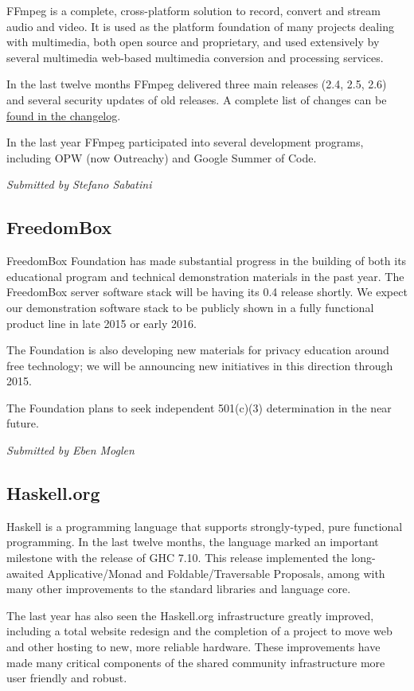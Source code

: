 \documentclass[letterpaper]{report}
\begin{document}
FFmpeg is a complete, cross-platform solution to record, convert and stream
audio and video. It is used as the platform foundation of many projects
dealing with multimedia, both open source and proprietary, and used
extensively by several multimedia web-based multimedia conversion and
processing services.

In the last twelve months FFmpeg delivered three main releases (2.4, 2.5,
2.6) and several security updates of old releases. A complete list of
changes can be
\href{http://git.videolan.org/?p=ffmpeg.git;a=blob_plain;f=Changelog;hb=HEAD}{found
in the changelog}.

In the last year FFmpeg participated into several development programs,
including OPW (now Outreachy) and Google Summer of Code.

{\em Submitted by Stefano Sabatini}

\subsection{FreedomBox}

FreedomBox Foundation has made substantial progress in the building of both
its educational program and technical demonstration materials in the past
year.  The FreedomBox server software stack will be having its 0.4 release
shortly.  We expect our demonstration software stack to be publicly shown
in a fully functional product line in late 2015 or early 2016.

The Foundation is also developing new materials for privacy education
around free technology; we will be announcing new initiatives in this
direction through 2015.

The Foundation plans to seek independent 501(c)(3) determination in the
near future.

{\em Submitted by Eben Moglen}

\subsection{Haskell.org}

Haskell is a programming language that supports strongly-typed, pure
functional programming.  In the last twelve months, the language marked an
important milestone with the release of GHC 7.10.  This release implemented
the long-awaited Applicative/Monad and Foldable/Traversable Proposals,
among with many other improvements to the standard libraries and language
core.

The last year has also seen the Haskell.org infrastructure greatly
improved, including a total website redesign and the completion of a
project to move web and other hosting to new, more reliable hardware.
These improvements have made many critical components of the shared
community infrastructure more user friendly and robust.
\end{document}
